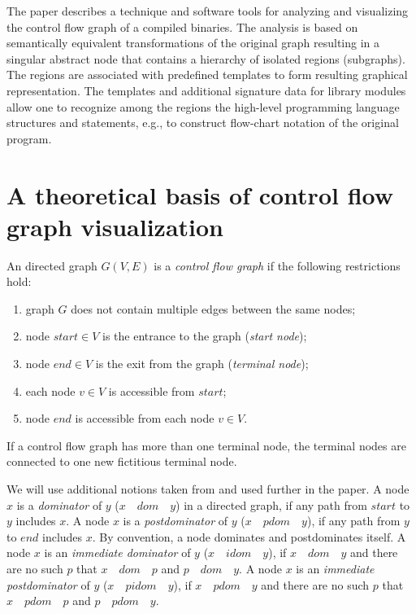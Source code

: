 \documentclass[conference]{IEEEtran}
\begin{document}
The paper describes a technique and software tools for analyzing and visualizing the control flow graph of a compiled binaries.  The analysis is based on semantically equivalent transformations of the original graph resulting in a singular abstract node that contains a hierarchy of isolated regions (subgraphs).  The regions are associated with predefined templates to form resulting graphical representation.  The templates and additional signature data for library modules allow one to recognize among the regions the high-level programming language structures and statements, e.g., to construct flow-chart notation of the original program.

\section{A theoretical basis of control flow\\ graph visualization}

An directed graph $G(V,E)$ is a \emph{control flow graph} if the following restrictions hold:
\begin{enumerate}
\item graph $G$ does not contain multiple edges between the same nodes;
\item node $start\in V$ is the entrance to the graph (\emph{start node});
\item node $end \in V$ is the exit from the graph (\emph{terminal node});
\item each node $v \in V$ is accessible from $start$;
\item node $end$ is accessible from each node $v \in V$.
\end{enumerate}
If a control flow graph has more than one terminal node, the terminal nodes are connected to one new fictitious terminal node.

We will use additional notions taken from \cite{sese} and used further in the paper.  A node $x$ is a \emph{dominator} of $y$ ($x\quad dom\quad y$) in a directed graph, if any path from $start$ to $y$ includes $x$.  A node $x$ is a \emph{postdominator} of $y$ ($x\quad pdom\quad y$), if any path from $y$ to $end$ includes $x$.  By convention, a node dominates and postdominates itself.  A node $x$ is an \emph{immediate dominator} of $y$ ($x\quad idom\quad y$), if $x\quad dom\quad y$ and there are no such $p$ that $x\quad dom\quad p$ and $p\quad dom\quad y$.  A node $x$ is an \emph{immediate postdominator} of $y$ ($x\quad pidom\quad y$), if $x\quad pdom\quad y$ and there are no such $p$ that $x\quad pdom\quad p$ and $p\quad pdom\quad y$.
\end{document}
